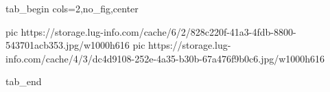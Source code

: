  
 
 
 
 


\ifcmt
  tab_begin cols=2,no_fig,center

     pic https://storage.lug-info.com/cache/6/2/828c220f-41a3-4fdb-8800-543701acb353.jpg/w1000h616
		 pic https://storage.lug-info.com/cache/4/3/dc4d9108-252e-4a35-b30b-67a476f9b0c6.jpg/w1000h616

  tab_end
\fi
